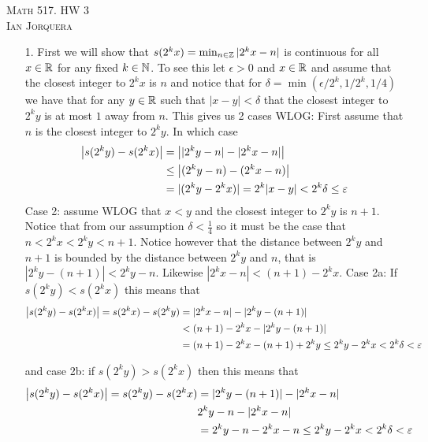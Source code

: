 \documentclass[12pt]{amsart}
\begin{document}
\begin{center}
   \textsc{Math 517. HW 3\\ Ian Jorquera}
\end{center}
\vspace{1em}

\begin{itemize}
   \item[1.]
      First we will show that $s(2^kx)=\min_{n\in\mathbb{Z}}|2^kx-n|$ is continuous for all $x\in \mathbb{R}$ for any fixed $k\in\mathbb{N}$.
      To see this let $\epsilon>0$ and $x\in \mathbb{R}$ and assume that the closest integer to $2^kx$ is $n$ and
      notice that for $\delta=\min(\epsilon/2^{k},1/2^{k},1/4)$ we have that for any $y\in\mathbb{R}$
      such that $|x-y|<\delta$ that the closest integer to $2^ky$ is at most $1$ away from $n$.
      This gives us 2 cases WLOG: First assume that $n$ is the closest integer to $2^ky$. In which case
      \begin{align*}
         \left\vert s(2^ky)-s(2^kx) \right\vert & =\left\vert |2^ky-n|-|2^kx-n| \right\vert                      \\
                               & \leq \left\vert (2^ky-n)-(2^kx-n) \right\vert                  \\
                               & =|(2^ky-2^kx)|=2^k|x-y|<2^k\delta\leq\varepsilon
      \end{align*}
      Case 2: assume WLOG that $x<y$ and the closest integer to $2^ky$ is $n+1$.
      Notice that from our assumption $\delta<\frac{1}{4}$ so it must be the case that $n<2^kx<2^ky<n+1$.
      Notice however that the distance between $2^ky$ and $n+1$ is bounded by the distance between $2^ky$ and $n$, that is $|2^ky-(n+1)|< 2^ky-n$.
      Likewise $|2^kx-n|< (n+1)-2^kx$.
      Case 2a: If $s(2^ky)<s(2^kx)$ this means that
      \begin{align*}
         \left\vert s(2^ky)-s(2^kx) \right\vert=s(2^kx)-s(2^ky) & =|2^kx-n|-|2^ky-(n+1)|                                  \\
                                               & <(n+1)-2^kx-|2^ky-(n+1)|                                \\
                                               & =(n+1)-2^kx-(n+1)+2^ky\leq 2^ky-2^kx<2^k\delta<\varepsilon
      \end{align*}

      and case 2b: if $s(2^ky)>s(2^kx)$ then this means that
      \begin{align*}
         \left\vert s(2^ky)-s(2^kx) \right\vert=s(2^ky)-s(2^kx) & =|2^ky-(n+1)|-|2^kx-n|                          \\
                                               & 2^ky-n-|2^kx-n|                                 \\
                                               & =2^ky-n-2^kx-n\leq 2^ky-2^kx<2^k\delta<\varepsilon
      \end{align*}


\end{itemize}
\end{document}
